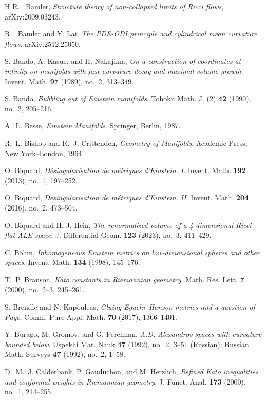 \documentclass[11pt,reqno]{amsart}
\numberwithin{equation}{section}
\theoremstyle{definition}
\theoremstyle{remark}
\begin{document}
\begin{thebibliography}{H}
R.~ Bamler, 
\textit{Structure theory of non-collapsed limits of Ricci flows},  	arXiv:2009.03243.


R.~ Bamler and Y. Lai,
\textit{The PDE-ODI principle and cylindrical mean curvature flows}.
arXiv:2512.25050.

S. Bando, A. Kasue, and H. Nakajima,
\textit{On a construction of coordinates at infinity on manifolds with fast curvature decay and maximal volume growth}.
Invent. Math. \textbf{97} (1989), no.~2, 313--349.

S. Bando,
\textit{Bubbling out of Einstein manifolds}.
Tohoku Math. J. (2) \textbf{42} (1990), no.~2, 205--216.

A.~L. Besse,
\textit{Einstein Manifolds}.
Springer, Berlin, 1987.

R.~L. Bishop and R.~J. Crittenden,
\textit{Geometry of Manifolds}.
Academic Press, New York--London, 1964.

O. Biquard,
{\textit{Désingularisation de métriques d’Einstein. I}}.
Invent. Math. \textbf{192} (2013), no.~1, 197--252.

O. Biquard,
\textit{Désingularisation de métriques d’Einstein. II}.
Invent. Math. \textbf{204} (2016), no.~2, 473--504.

O. Biquard and H.-J. Hein,
\textit{The renormalized volume of a 4-dimensional Ricci-flat ALE space}.
J. Differential Geom. \textbf{123} (2023), no.~3, 411--429.

C. Böhm,
\textit{Inhomogeneous Einstein metrics on low-dimensional spheres and other spaces}.
Invent. Math. \textbf{134} (1998), 145--176.

T.~P. Branson,
{\textit{Kato constants in Riemannian geometry}}.
Math. Res. Lett. \textbf{7} (2000), no.~2--3, 245--261.

S. Brendle and N. Kapouleas,
\textit{Gluing Eguchi--Hanson metrics and a question of Page}.
Comm. Pure Appl. Math. \textbf{70} (2017), 1366--1401.

Y. Burago, M. Gromov, and G. Perelman,
\textit{A.D. Alexandrov spaces with curvature bounded below}.
Uspekhi Mat. Nauk \textbf{47} (1992), no.~2, 3--51 (Russian);
Russian Math. Surveys \textbf{47} (1992), no.~2, 1--58.

D.~M.~J. Calderbank, P. Gauduchon, and M. Herzlich,
{\textit{Refined Kato inequalities and conformal weights in Riemannian geometry}}.
J. Funct. Anal. \textbf{173} (2000), no.~1, 214--255.


\end{thebibliography}
\end{document}

